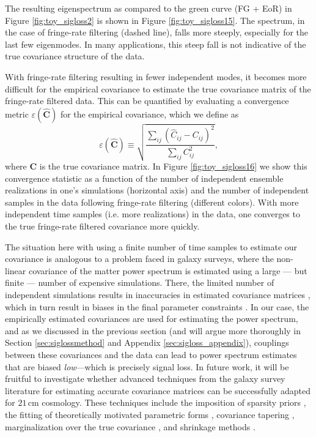 \documentclass[preprint2,numberedappendix,tighten]{aastex6}  %
\newcommand{\C}{\mathbf{C}}
\newcommand{\Chat}{\mathbf{\widehat{C}}}
\begin{document}
The resulting eigenspectrum as compared to the green curve (FG + EoR) in Figure \ref{fig:toy_sigloss2} is shown in Figure 
\ref{fig:toy_sigloss15}. The spectrum, in the case of fringe-rate filtering (dashed line), falls more steeply, especially for 
the last few eigenmodes. In many applications, this steep fall is not indicative of the true covariance structure of the data.

With 
fringe-rate filtering resulting in fewer independent modes, it becomes more difficult for the empirical covariance to estimate the 
true covariance matrix of the fringe-rate filtered data. This can be quantified by evaluating a convergence metric $\varepsilon(\Chat)$ for the empirical covariance, which we define as
\begin{equation}
\label{eq:converge}
\varepsilon (\Chat) \equiv \sqrt{\frac{\sum_{ij} (\widehat{C}_{ij} - {C}_{ij})^2}{\sum_{ij} {C}_{ij}^2}},
\end{equation}
where $\C$ is the true covariance matrix. In Figure \ref{fig:toy_sigloss16} we show this convergence statistic as a function of the number of independent ensemble realizations in one's simulations (horizontal axis) and the number of independent samples in the data following fringe-rate filtering (different colors). With more independent time samples (i.e. more realizations) in the data, one converges to the true fringe-rate filtered covariance more quickly. 

The situation here with using a finite number of time samples to estimate our covariance is analogous to a problem faced in galaxy surveys, where the non-linear covariance 
of the matter power spectrum is estimated using a large --- but finite --- number of expensive simulations. There, the limited 
number of independent simulations results in inaccuracies in estimated covariance matrices 
\citep{dodelson_schneider2013,taylor_joachimi_etal2014}, which in turn result in biases in the final parameter constraints 
\citep{hartlap_et_al2007}. In our case, the empirically estimated covariances are used for estimating the power spectrum, and 
as we discussed in the previous section (and will argue more thoroughly in Section \ref{sec:siglossmethod} and Appendix \ref{sec:sigloss_appendix}), couplings between these covariances and the data can lead to power spectrum estimates that are biased 
\emph{low}---which is precisely signal loss. In future work, it will be fruitful to investigate whether advanced techniques from the 
galaxy survey literature for estimating accurate covariance matrices can be successfully adapted for $21\,\textrm{cm}$ 
cosmology. These techniques include the imposition of sparsity priors \citep{padmanabhan_et_al2016}, the fitting of 
theoretically motivated parametric forms \citep{pearson_samushia2016}, covariance tapering \citep{paz_sanchez2015}, 
marginalization over the true covariance \citep{sellentin_heavens2016}, and shrinkage methods 
\citep{pope_szapudi2008,joachimi_2017}.
\end{document}
